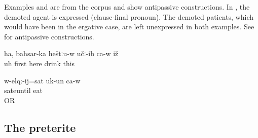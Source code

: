 Examples  and  are from the corpus and show antipassive constructions. In , the demoted agent is expressed (clause-final pronoun). The demoted patients, which would have been in the ergative case, are left unexpressed in both examples. See  for antipassive constructions.
%
\begin{exe}
	\ex	\label{ex:Uh, first he drank here analytic}
	\gll	ha,	bahsar-ka	heštːu-w	učː-ib	ca-w	iž\\
		uh	first	here	 drink		this\\
	\glt	{}

	\ex	\label{ex:He ate until he was full analytic}
	\gll	w-elqː-ij=sat	uk-un	ca-w\\
		sateuntil	eat	\\
	\glt	{} OR 
\end{exe}



\subsection{The preterite}
\label{ssec:The preterite}

